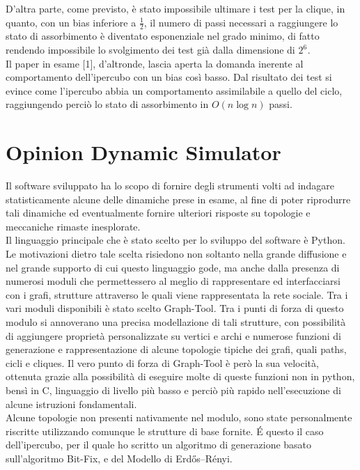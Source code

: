 \documentclass{article}
\begin{document}
D'altra parte, come previsto, è stato impossibile ultimare i test per la clique, in quanto, con un bias inferiore a $\frac{1}{2}$, il numero di passi necessari a raggiungere lo stato di assorbimento è diventato esponenziale nel grado minimo, di fatto rendendo impossibile lo svolgimento dei test già dalla dimensione di $2^{6^{\mathrm{}}}$.\\
Il paper in esame [1], d'altronde, lascia aperta la domanda inerente al comportamento dell'ipercubo con un bias così basso. Dal risultato dei test si evince come l'ipercubo abbia un comportamento assimilabile a quello del ciclo, raggiungendo perciò lo stato di assorbimento in $O(n\log{}n)$ passi.


\section{Opinion Dynamic Simulator}
Il software sviluppato ha lo scopo di fornire degli strumenti volti ad indagare statisticamente alcune delle dinamiche prese in esame, al fine di poter riprodurre tali dinamiche ed eventualmente fornire ulteriori risposte su topologie e meccaniche rimaste inesplorate.\\
Il linguaggio principale che è stato scelto per lo sviluppo del software è Python. Le motivazioni dietro tale scelta risiedono non soltanto nella grande diffusione e nel grande supporto di cui questo linguaggio gode, ma anche dalla presenza di numerosi moduli che permettessero al meglio di rappresentare ed interfacciarsi con i grafi, strutture attraverso le quali viene rappresentata la rete sociale.
Tra i vari moduli disponibili è stato scelto Graph-Tool. Tra i punti di forza di questo modulo si annoverano una precisa modellazione di tali strutture, con possibilità di aggiungere proprietà personalizzate su vertici e archi e numerose funzioni di generazione e rappresentazione di alcune topologie tipiche dei grafi, quali paths, cicli e cliques. Il vero punto di forza di Graph-Tool è però la sua velocità, ottenuta grazie alla possibilità di eseguire molte di queste funzioni non in python, bensì in C, linguaggio di livello più basso e perciò più rapido nell'esecuzione di alcune istruzioni fondamentali.\\
Alcune topologie non presenti nativamente nel modulo, sono state personalmente riscritte utilizzando comunque le strutture di base fornite. É questo il caso dell'ipercubo, per il quale ho scritto un algoritmo di generazione basato sull'algoritmo Bit-Fix, e del Modello di Erdős–Rényi.\\
\end{document}
